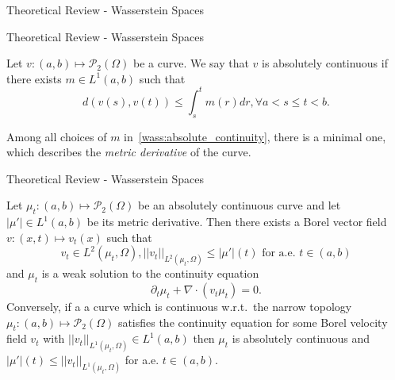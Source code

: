 \documentclass{beamer}
\begin{document}
{\begin{frame}{Theoretical Review - Wasserstein Spaces}
\end{frame}



\begin{frame}{Theoretical Review - Wasserstein Spaces}

\begin{definition}\label{wass:absolutely_continuous_curves}
    Let $v : (a,b) \mapsto \mathcal{P}_2(\Omega)$ be a curve.
    We say that $v$ is absolutely continuous if there exists
    $m \in L^1(a,b)$ such that
    \begin{equation}\label{wass:absolute_continuity}
        d(v(s), v(t)) \leq \int_s^t m(r) dr, \forall a < s \leq t < b.
    \end{equation}
\end{definition}

Among all choices of $m$ in~\eqref{wass:absolute_continuity}, there is a minimal
one, which describes the \textit{metric derivative} of the curve.
\end{frame}

\begin{frame}{Theoretical Review - Wasserstein Spaces}

\begin{theorem}\label{wass:abs_continuity_and_continuity_eq}
    Let $\mu_t : (a,b) \mapsto \mathcal{P}_2(\Omega)$ be an absolutely continuous
    curve and let $|\mu'| \in L^1(a,b)$ be its metric derivative.
    Then there exists a Borel vector field $v : (x,t) \mapsto v_t(x)$ such that
    \begin{equation}
        v_t \in L^2(\mu_t, \Omega), ||v_t||_{L^2(\mu_t, \Omega)} \leq |\mu'|(t)\text{ for a.e. } t \in (a,b)
    \end{equation}
    and $\mu_t$ is a weak solution to the continuity equation
    \begin{equation}
        \partial_t \mu_t + \nabla \cdot (v_t \mu_t) = 0.
    \end{equation}
    Conversely, if a a curve which is continuous w.r.t.~the narrow topology
    $\mu_t : (a,b) \mapsto \mathcal{P}_2(\Omega)$
    satisfies the continuity equation for some Borel velocity field $v_t$ with
    $||v_t||_{L^1(\mu_t, \Omega)} \in L^1(a,b)$ then $\mu_t$ is absolutely continuous
    and $ |\mu'|(t) \leq  ||v_t||_{L^1(\mu_t, \Omega)}$ for a.e. $t \in (a,b)$.
\end{theorem}

\end{frame}

}
\end{document}
